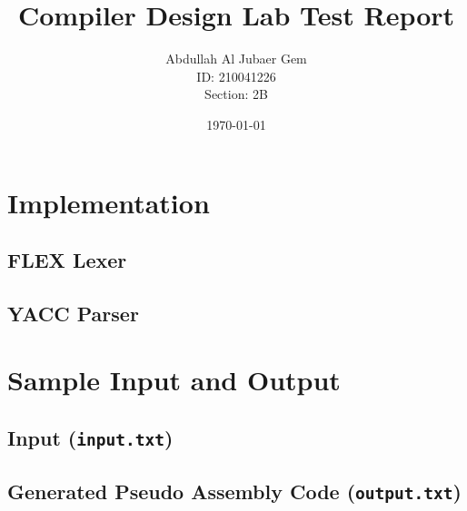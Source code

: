 \documentclass{article}
\title{Compiler Design Lab Test Report\\}
\author{Abdullah Al Jubaer Gem\\ID: 210041226\\Section: 2B}
\date{\today}
\begin{document}
\maketitle


\section{Implementation}

\subsection{FLEX Lexer}


\subsection{YACC Parser}




\section{Sample Input and Output}

\subsection{Input (\texttt{input.txt})}


\subsection{Generated Pseudo Assembly Code (\texttt{output.txt})}

\end{document}
